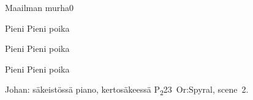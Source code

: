\documentclass[11pt,a4paper]{article}
\begin{document}
\begin{mysong}{Maailman murha}{0}
\begin{SBChorus}
  Pieni     Pieni poika
    
\end{SBChorus}


\begin{SBChorus}
  Pieni     Pieni poika
    
\end{SBChorus}


\begin{SBChorus}
  Pieni     Pieni poika
    
\end{SBChorus}


{\SBLyricNoteFont Johan: säkeistössä piano, kertosäkeessä
P\textsubscript{2}23~Or:Spyral, scene~2.}

\end{mysong}
\end{document}
